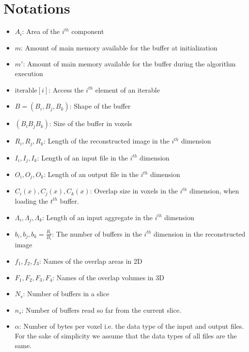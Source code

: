 \documentclass[conference]{IEEEtran}
\begin{document}
\section{Notations}
\begin{itemize}
  \item $A_i$: Area of the $i^{th}$ component
  \item $m$: Amount of main memory available for the buffer at initialization
  \item $m'$: Amount of main memory available for the buffer during the algorithm execution
  \item $\textrm{iterable}[i]$: Access the $i^{th}$ element of an iterable
  \item $B = (B_i, B_j, B_k)$: Shape of the buffer
  \item $(B_i B_j B_k)$: Size of the buffer in voxels
  \item $R_i, R_j, R_k$: Length of the reconstructed image in the $i^{th}$ dimension
  \item $I_i, I_j, I_k$: Length of an input file in the $i^{th}$ dimension
  \item $O_i, O_j, O_k$: Length of an output file in the $i^{th}$ dimension
  \item $C_i(x), C_j(x), C_k(x)$: Overlap size in voxels in the $i^{th}$ dimension, when loading the $t^{th}$ buffer.
  \item $\Lambda_i, \Lambda_j, \Lambda_k$: Length of an input aggregate in the $i^{th}$ dimension
  \item $b_i, b_j, b_k = \frac{R_i}{B_i}$: The number of buffers in the $i^{th}$ dimension in the reconstructed image
  \item $f_1, f_2, f_3$: Names of the overlap areas in 2D
  \item $F_1, F_2, F_3, F_4$: Names of the overlap volumes in 3D
  \item $ N_s $: Number of buffers in a slice
  \item $ n_s $: Number of buffers read so far from the current slice.
  \item $\alpha$: Number of bytes per voxel i.e. the data type of the input and output files. For the sake of simplicity we assume that the data types of all files are the same.
\end{itemize}
\end{document}
